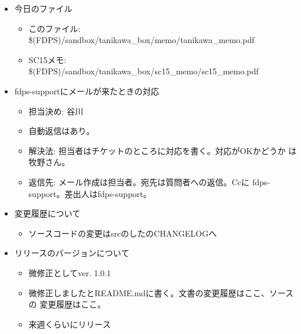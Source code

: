 \begin{itemize}

\item 今日のファイル
  \begin{itemize}
  \item このファイル: \$(FDPS)/sandbox/tanikawa\_box/memo/tanikawa\_memo.pdf
  \item SC15メモ: \$(FDPS)/sandbox/tanikawa\_box/sc15\_memo/sc15\_memo.pdf
  \end{itemize}

\item fdps-supportにメールが来たときの対応 
  \begin{itemize}
  \item 担当決め: 谷川
  \item 自動返信はあり。
  \item 解決法: 担当者はチケットのところに対応を書く。対応がOKかどうか
    は牧野さん。
  \item 返信先: メール作成は担当者。宛先は質問者への返信。Ccに
    fdps-support。差出人はfdps-support。
  \end{itemize}

\item 変更履歴について 
  \begin{itemize}
  \item ソースコードの変更はsrcのしたのCHANGELOGへ
  \end{itemize}

\item リリースのバージョンについて
  \begin{itemize}
  \item 微修正としてver. 1.0.1
  \item 微修正しましたとREADME.mdに書く。文書の変更履歴はここ、ソースの
    変更履歴はここ。
  \item 来週くらいにリリース
  \end{itemize}


\end{itemize}
